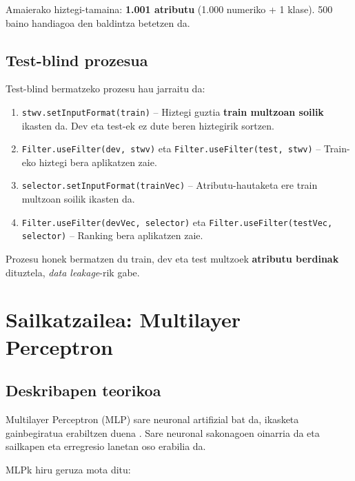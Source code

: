 \documentclass[12pt, a4paper]{article}
\begin{document}
Amaierako hiztegi-tamaina: \textbf{1.001 atributu} (1.000 numeriko + 1 klase).
500 baino handiagoa den baldintza betetzen da.

\subsection{Test-blind prozesua}

Test-blind bermatzeko prozesu hau jarraitu da:

\begin{enumerate}
    \item \texttt{stwv.setInputFormat(train)} -- Hiztegi guztia \textbf{train multzoan
    soilik} ikasten da. Dev eta test-ek ez dute beren hiztegirik sortzen.
    \item \texttt{Filter.useFilter(dev, stwv)} eta \texttt{Filter.useFilter(test, stwv)}
    -- Train-eko hiztegi bera aplikatzen zaie.
    \item \texttt{selector.setInputFormat(trainVec)} -- Atributu-hautaketa ere
    train multzoan soilik ikasten da.
    \item \texttt{Filter.useFilter(devVec, selector)} eta
    \texttt{Filter.useFilter(testVec, selector)} -- Ranking bera aplikatzen zaie.
\end{enumerate}

Prozesu honek bermatzen du train, dev eta test multzoek \textbf{atributu berdinak}
dituztela, \textit{data leakage}-rik gabe.

\newpage
\section{Sailkatzailea: Multilayer Perceptron}

\subsection{Deskribapen teorikoa}

Multilayer Perceptron (MLP) sare neuronal artifizial bat da, ikasketa gainbegiratua
erabiltzen duena \cite{goodfellow2016, bishop2006}. Sare neuronal sakonagoen oinarria
da eta sailkapen eta erregresio lanetan oso erabilia da.

MLPk hiru geruza mota ditu:
\end{document}

